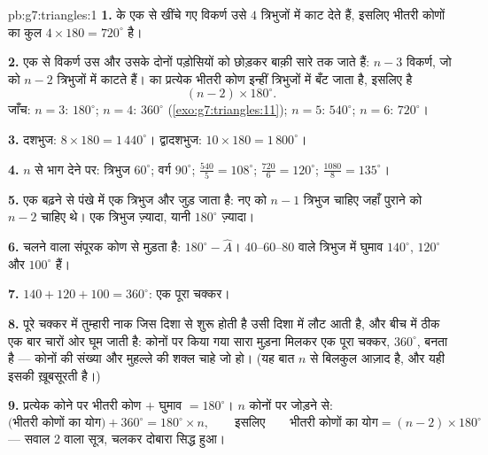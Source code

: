 \begin{solution}{pb:g7:triangles:1}
\textbf{1.}  के एक  से खींचे गए विकर्ण उसे $4$
त्रिभुजों में काट देते हैं, इसलिए भीतरी कोणों का कुल
$4 \times 180 = 720^\circ$ है।

\textbf{2.} एक  से विकर्ण उस  और उसके दोनों पड़ोसियों
को छोड़कर बाक़ी सारे  तक जाते हैं: $n - 3$ विकर्ण, जो
 को $n - 2$ त्रिभुजों में काटते हैं।  का प्रत्येक
भीतरी कोण इन्हीं त्रिभुजों में बँट जाता है, इसलिए  है
\[
(n - 2) \times 180^\circ .
\]
जाँच: $n = 3$: $180^\circ$; $n = 4$: $360^\circ$
(\cref{exo:g7:triangles:11}); $n = 5$: $540^\circ$; $n = 6$:
$720^\circ$।

\textbf{3.} दशभुज: $8 \times 180 = 1\,440^\circ$। द्वादशभुज:
$10 \times 180 = 1\,800^\circ$।

\textbf{4.} $n$ से भाग देने पर: त्रिभुज $60^\circ$; वर्ग
$90^\circ$;  $\frac{540}{5} = 108^\circ$; 
$\frac{720}{6} = 120^\circ$;  $\frac{1080}{8} =
135^\circ$।

\textbf{5.} एक  बढ़ने से पंखे में एक त्रिभुज और जुड़ जाता है:
नए  को $n - 1$ त्रिभुज चाहिए जहाँ पुराने को $n - 2$ चाहिए
थे। एक त्रिभुज ज़्यादा, यानी $180^\circ$ ज़्यादा।

\textbf{6.} चलने वाला संपूरक कोण से मुड़ता है:
$180^\circ - \widehat A$। $40$--$60$--$80$ वाले त्रिभुज में घुमाव
$140^\circ$, $120^\circ$ और $100^\circ$ हैं।

\textbf{7.} $140 + 120 + 100 = 360^\circ$: एक पूरा चक्कर।

\textbf{8.} पूरे चक्कर में तुम्हारी नाक जिस दिशा से शुरू होती है
उसी दिशा में लौट आती है, और बीच में ठीक एक बार चारों ओर घूम जाती
है: कोनों पर किया गया सारा मुड़ना मिलकर एक पूरा चक्कर,
$360^\circ$, बनता है --- कोनों की संख्या और मुहल्ले की शक्ल चाहे
जो हो। (यह बात $n$ से बिलकुल आज़ाद है, और यही इसकी ख़ूबसूरती है।)

\textbf{9.} प्रत्येक कोने पर भीतरी कोण $+$ घुमाव $= 180^\circ$।
$n$ कोनों पर जोड़ने से:
\[
\text{(भीतरी कोणों का योग)} + 360^\circ = 180^\circ \times n,
\qquad\text{इसलिए}\qquad
\text{भीतरी कोणों का योग} = (n - 2) \times 180^\circ
\]
--- सवाल 2 वाला सूत्र, चलकर दोबारा सिद्ध हुआ।


\end{solution}
